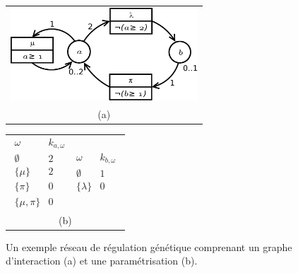 \begin{figure}[htbp]
  \centering%
    \begin{tabular}{c}
      \includegraphics[width=7cm]{figs/gi-avec-multiplexe}
      \\\small(a)
    \end{tabular}
\hspace{.5cm} %
    \begin{tabular}{c}
    $\begin{array}{c|c}
      \omega & k_{a, \omega}\\
      \hline
      \emptyset & 2\\
      \{\mu\} & 2\\
      \{\pi\} & 0\\
      \{\mu, \pi\} & 0
    \end{array}$\hspace{.5cm}%
    $\begin{array}{c|c}
      \omega & k_{b, \omega}\\
      \hline
      \emptyset & 1\\
      \{\lambda\} & 0
    \end{array}$%
    \\\small(b)
    \end{tabular}
  \caption{Un exemple réseau de régulation génétique comprenant un graphe d'interaction (a) et une paramétrisation (b). \cite{richard-comet-bernot-08}}
  \label{rrg-ex-parametrisation}
\end{figure}


